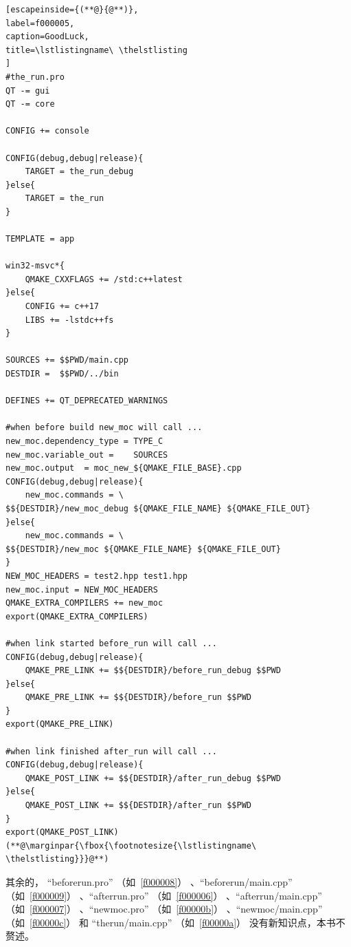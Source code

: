\FloatBarrier
\begin{lstlisting}[escapeinside={(**@}{@**)},
label=f000005,
caption=GoodLuck,
title=\lstlistingname\ \thelstlisting
]
#the_run.pro
QT -= gui
QT -= core

CONFIG += console

CONFIG(debug,debug|release){
    TARGET = the_run_debug
}else{
    TARGET = the_run
}

TEMPLATE = app

win32-msvc*{
    QMAKE_CXXFLAGS += /std:c++latest
}else{
    CONFIG += c++17
    LIBS += -lstdc++fs
}

SOURCES += $$PWD/main.cpp
DESTDIR =  $$PWD/../bin

DEFINES += QT_DEPRECATED_WARNINGS

#when before build new_moc will call ...
new_moc.dependency_type = TYPE_C
new_moc.variable_out =    SOURCES
new_moc.output  = moc_new_${QMAKE_FILE_BASE}.cpp
CONFIG(debug,debug|release){
    new_moc.commands = \
$${DESTDIR}/new_moc_debug ${QMAKE_FILE_NAME} ${QMAKE_FILE_OUT}
}else{
    new_moc.commands = \
$${DESTDIR}/new_moc ${QMAKE_FILE_NAME} ${QMAKE_FILE_OUT}
}
NEW_MOC_HEADERS = test2.hpp test1.hpp
new_moc.input = NEW_MOC_HEADERS
QMAKE_EXTRA_COMPILERS += new_moc
export(QMAKE_EXTRA_COMPILERS)

#when link started before_run will call ...
CONFIG(debug,debug|release){
    QMAKE_PRE_LINK += $${DESTDIR}/before_run_debug $$PWD
}else{
    QMAKE_PRE_LINK += $${DESTDIR}/before_run $$PWD
}
export(QMAKE_PRE_LINK)

#when link finished after_run will call ...
CONFIG(debug,debug|release){
    QMAKE_POST_LINK += $${DESTDIR}/after_run_debug $$PWD
}else{
    QMAKE_POST_LINK += $${DESTDIR}/after_run $$PWD
}
export(QMAKE_POST_LINK)
(**@\marginpar{\fbox{\footnotesize{\lstlistingname\ \thelstlisting}}}@**)\end{lstlisting}          %



其余的，
“before\underline{\hspace{0.5em}}run.pro”
（如\lstlistingname\ \ref{f000008}）
、“before\underline{\hspace{0.5em}}run/main.cpp”
（如\lstlistingname\ \ref{f000009}）
、“after\underline{\hspace{0.5em}}run.pro”
（如\lstlistingname\ \ref{f000006}）
、“after\underline{\hspace{0.5em}}run/main.cpp”
（如\lstlistingname\ \ref{f000007}）
、“new\underline{\hspace{0.5em}}moc.pro”
（如\lstlistingname\ \ref{f00000b}）
、“new\underline{\hspace{0.5em}}moc/main.cpp”
（如\lstlistingname\ \ref{f00000c}）
和
“the\underline{\hspace{0.5em}}run/main.cpp”
（如\lstlistingname\ \ref{f00000a}）
没有新知识点，本书不赘述。

